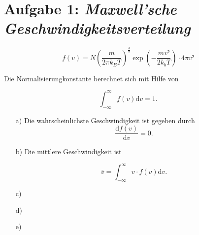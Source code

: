  
\section*{Aufgabe 1: \emph{Maxwell'sche Geschwindigkeitsverteilung}}

\begin{equation}
f(v)=N\left(\frac{m}{2\pi k_BT}\right)^\frac{3}{2}\exp{\left(-\frac{mv²}{2k_bT}\right)}\cdot4\pi v²
\end{equation}

Die Normalisierungkonstante berechnet sich mit Hilfe von

\begin{equation}
\int_{-\infty}^\infty f(v)\text{d}v=1.
\end{equation}

\begin{itemize}
\item[a)] Die wahrscheinlichste Geschwindigkeit ist gegeben durch
\begin{equation}
\frac{\text{d}f(v)}{\text{d}v}=0.
\end{equation}

\item[b)] Die mittlere Geschwindigkeit ist 

\begin{equation}
\bar{v}=\int_{-\infty}^\infty v\cdot f(v)\text{d}v.
\end{equation}



\item[c)]
\item[d)]
\item[e)]
\end{itemize}

